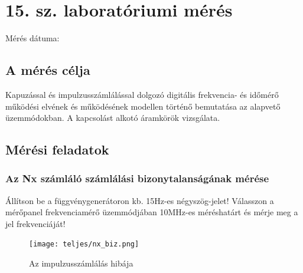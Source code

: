 \documentclass[10pt,a4paper]{article}
\begin{document}
\section{15. sz. laboratóriumi mérés}
	Mérés dátuma:\date{2016.09.27}
	\subsection{A mérés célja}
	Kapuzással és impulzusszámlálással dolgozó digitális frekvencia- és időmérő
működési elvének és működésének modellen történő bemutatása az alapvető
üzemmódokban. A kapcsolást alkotó áramkörök vizsgálata.

	\subsection{Mérési feladatok}
		\subsubsection{Az Nx számláló számlálási bizonytalanságának mérése}
		Állítson be a függvénygenerátoron kb. 15Hz-es négyszög-jelet! Válasszon a
mérőpanel frekvenciamérő üzemmódjában 10MHz-es méréshatárt és mérje
meg a jel frekvenciáját!
		\begin{figure}[hbtp]
		\centering
		\texttt{[image: teljes/nx\_biz.png]}
		\caption{Az impulzusszámlálás hibája}
		\end{figure}
\end{document}
